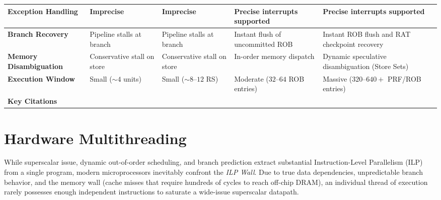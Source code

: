 \begin{table}[htbp]
\begin{center}
{\begin{tabularx}{\textwidth}{|>{\raggedright\arraybackslash\bfseries}p{2.2cm}|>{\raggedright\arraybackslash}X|>{\raggedright\arraybackslash}X|>{\raggedright\arraybackslash}X|>{\raggedright\arraybackslash}X|}
      \textbf{Exception Handling}   & Imprecise                      & Imprecise                      & Precise interrupts supported           & Precise interrupts supported \\ \hline
      \textbf{Branch Recovery}      & Pipeline stalls at branch      & Pipeline stalls at branch      & Instant flush of uncommitted ROB       & Instant ROB flush and RAT checkpoint recovery \\ \hline
      \textbf{Memory Disambiguation}& Conservative stall on store    & Conservative stall on store    & In-order memory dispatch               & Dynamic speculative disambiguation (Store Sets) \\ \hline
      \textbf{Execution Window}     & Small ($\sim 4$ units)         & Small ($\sim 8\text{--}12$ RS) & Moderate ($32\text{--}64$ ROB entries) & Massive ($320\text{--}640+$ PRF/ROB entries) \\ \hline
      \textbf{Key Citations}        & \cite{thornton1964}            & \cite{tomasulo1967}            & \cite{smith1988precise, sohi1990instruction} & \cite{yeager1996mips, kessler1999alpha, gochman2006intel, celio2018boom} \\ \hline
    \end{tabularx}
    }
  \end{center}
\end{table}

\section{Hardware Multithreading}\label{sec:hardware_multithreading}

While superscalar issue, dynamic out-of-order scheduling, and branch prediction extract substantial Instruction-Level Parallelism (ILP) from a single program, modern microprocessors inevitably confront the \textit{ILP Wall}. Due to true data dependencies, unpredictable branch behavior, and the memory wall (cache misses that require hundreds of cycles to reach off-chip DRAM), an individual thread of execution rarely possesses enough independent instructions to saturate a wide-issue superscalar datapath.

